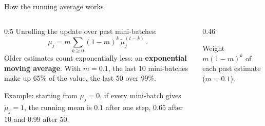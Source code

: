 \documentclass[11pt,aspectratio=169]{beamer}
\begin{document}
\begin{frame}{How the running average works}

    \begin{columns}[c,onlytextwidth]
        \begin{column}{0.5\textwidth}%
            \small\setlength{\parskip}{5pt}%
            \RaggedRight\setlength{\parindent}{0pt}%
            Unrolling the update over past mini-batches:
            \[
                \mu_j = m \sum_{k \ge 0} (1-m)^k \, \widetilde{\mu}_j^{(t-k)} \,.
            \]
            Older estimates count exponentially less: an
            \textbf{exponential moving average}. With $m=0.1$, the last 10
            mini-batches make up 65\% of the value, the last 50 over 99\%.

            Example: starting from $\mu_j = 0$, if every mini-batch gives
            $\widetilde{\mu}_j = 1$, the running mean is $0.1$ after one step,
            $0.65$ after 10 and $0.99$ after 50.
        \end{column}
        \begin{column}{0.46\textwidth}
            \centering

            {\scriptsize Weight $m(1-m)^k$ of each past estimate ($m=0.1$).}
        \end{column}
    \end{columns}

\end{frame}
\end{document}
